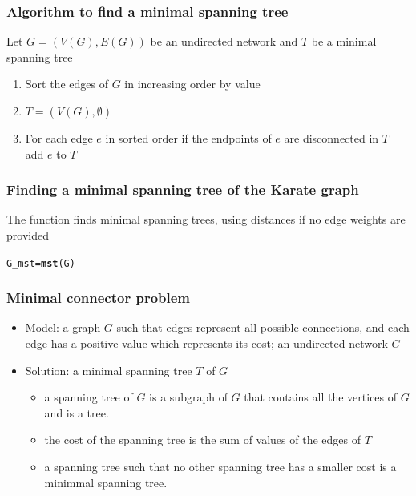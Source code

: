 \documentclass[aspectratio=169]{beamer}\usepackage[]{graphicx}\usepackage[]{xcolor}
\makeatletter
\newcommand{\hldef}[1]{\textcolor[rgb]{0.345,0.345,0.345}{#1}}%
\newcommand{\hlkwb}[1]{\textcolor[rgb]{0.69,0.353,0.396}{#1}}%
\newcommand{\hlkwd}[1]{\textcolor[rgb]{0.737,0.353,0.396}{\textbf{#1}}}%
\newenvironment{kframe}{%
 \def\at@end@of@kframe{}%
 \ifinner\ifhmode%
  \def\at@end@of@kframe{\end{minipage}}%
  \begin{minipage}{\columnwidth}%
 \fi\fi%
 \def\FrameCommand##1{\hskip\@totalleftmargin \hskip-\fboxsep
 \colorbox{shadecolor}{##1}\hskip-\fboxsep
     \hskip-\linewidth \hskip-\@totalleftmargin \hskip\columnwidth}%
 \MakeFramed {\advance\hsize-\width
   \@totalleftmargin\z@ \linewidth\hsize
   \@setminipage}}%
 {\par\unskip\endMakeFramed%
 \at@end@of@kframe}
\newenvironment{knitrout}{}{} %
\makeatother
\begin{document}
\begin{frame}\frametitle{Algorithm to find a minimal spanning tree}
Let $G=(V(G),E(G))$ be an undirected network and $T$ be a minimal spanning tree 
\vfill
\begin{enumerate}
\item Sort the edges of $G$ in increasing order by value
\item $T=(V(G),\emptyset)$
\item For each edge $e$ in sorted order
        if the endpoints of $e$ are disconnected in $T$
        add $e$ to $T$
\end{enumerate}
\end{frame}


\begin{frame}[fragile]\frametitle{Finding a minimal spanning tree of the Karate graph}
The function  finds minimal spanning trees, using distances if no edge weights are provided
\begin{knitrout}
\color{fgcolor}\begin{kframe}
\begin{alltt}
\hldef{G_mst} \hlkwb{=} \hlkwd{mst}\hldef{(G)}
\end{alltt}
\end{kframe}
\end{knitrout}
\end{frame}


\begin{frame}\frametitle{Minimal connector problem}
\begin{itemize}
\item Model: a graph $G$ such that edges represent all possible connections, and each edge has a positive value which represents its cost; 
an undirected network $G$
\item Solution: a  minimal spanning tree $T$ of $G$
\begin{itemize}
\item a spanning tree of $G$ is a subgraph of $G$ that contains all the vertices of $G$ and is a tree.
\item the cost of the spanning tree is the sum of values of the edges of $T$
\item a spanning tree such that no other spanning tree has a smaller cost is a minimmal spanning tree.
\end{itemize}
\end{itemize}
\end{frame}
\end{document}
